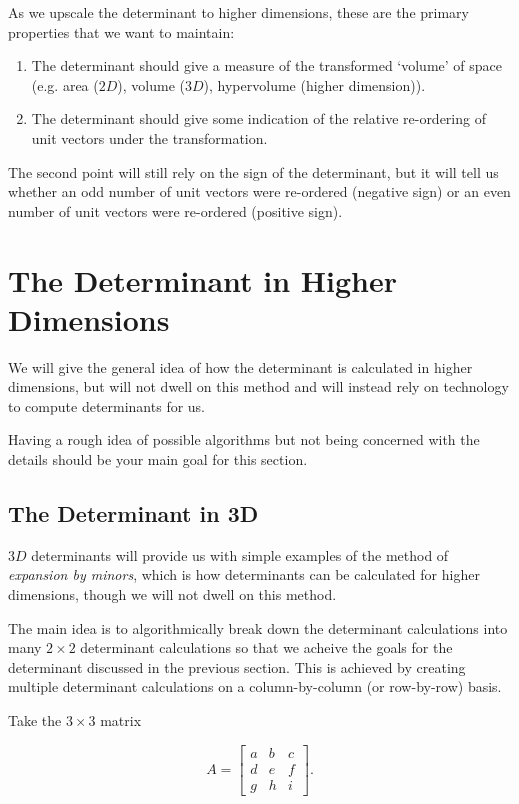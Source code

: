 \documentclass{ximera}
\begin{document}
As we upscale the determinant to higher dimensions, these are the primary properties that we want to maintain:

\begin{enumerate}
    \item The determinant should give a measure of the transformed `volume' of space (e.g. area ($2D$), volume ($3D$), hypervolume (higher dimension)).
    \item The determinant should give some indication of the relative re-ordering of unit vectors under the transformation.
\end{enumerate}

The second point will still rely on the sign of the determinant, but it will tell us whether an odd number of unit vectors were re-ordered (negative sign) or an even number of unit vectors were re-ordered (positive sign).


\section*{The Determinant in Higher Dimensions}

We will give the general idea of how the determinant is calculated in higher dimensions, but will not dwell on this method and will instead rely on technology to compute determinants for us. 

Having a rough idea of possible algorithms but not being concerned with the details should be your main goal for this section.

\subsection*{The Determinant in 3D}

$3D$ determinants will provide us with simple examples of the method of \emph{expansion by minors}, which is how determinants can be calculated for higher dimensions, though we will not dwell on this method.

The main idea is to algorithmically break down the determinant calculations into many $2\times 2$ determinant calculations so that we acheive the goals for the determinant discussed in the previous section. This is achieved by creating multiple determinant calculations on a column-by-column (or row-by-row) basis. 

Take the $3\times 3$ matrix 

$$A=\begin{bmatrix}a&b&c\\d&e&f\\g&h&i\end{bmatrix}.$$
\end{document}
